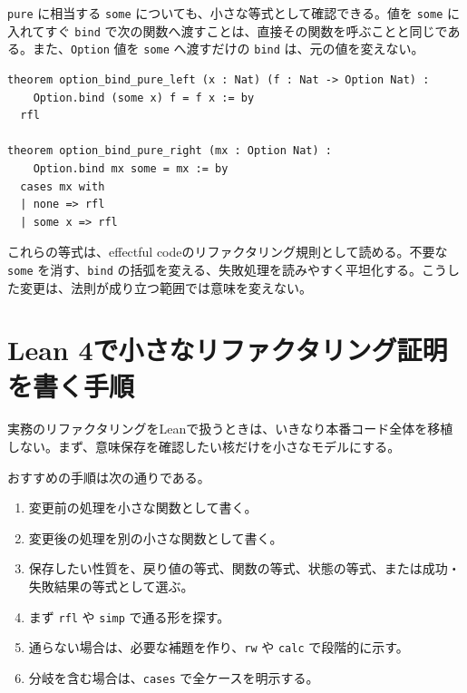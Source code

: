 \texttt{pure} に相当する \texttt{some} についても、小さな等式として確認できる。値を \texttt{some} に入れてすぐ \texttt{bind} で次の関数へ渡すことは、直接その関数を呼ぶことと同じである。また、\texttt{Option} 値を \texttt{some} へ渡すだけの \texttt{bind} は、元の値を変えない。

\begin{listing}[htbp]
\begin{verbatim}
theorem option_bind_pure_left (x : Nat) (f : Nat -> Option Nat) :
    Option.bind (some x) f = f x := by
  rfl

theorem option_bind_pure_right (mx : Option Nat) :
    Option.bind mx some = mx := by
  cases mx with
  | none => rfl
  | some x => rfl
\end{verbatim}
\caption{\texttt{Option} における \texttt{pure} 相当の整理規則}
\label{lst:ch28-option-pure-laws}
\end{listing}

これらの等式は、effectful codeのリファクタリング規則として読める。不要な \texttt{some} を消す、\texttt{bind} の括弧を変える、失敗処理を読みやすく平坦化する。こうした変更は、法則が成り立つ範囲では意味を変えない。

\section{Lean 4で小さなリファクタリング証明を書く手順}

実務のリファクタリングをLeanで扱うときは、いきなり本番コード全体を移植しない。まず、意味保存を確認したい核だけを小さなモデルにする。

\begin{softwarebox}
おすすめの手順は次の通りである。
\begin{enumerate}
\item 変更前の処理を小さな関数として書く。
\item 変更後の処理を別の小さな関数として書く。
\item 保存したい性質を、戻り値の等式、関数の等式、状態の等式、または成功・失敗結果の等式として選ぶ。
\item まず \texttt{rfl} や \texttt{simp} で通る形を探す。
\item 通らない場合は、必要な補題を作り、\texttt{rw} や \texttt{calc} で段階的に示す。
\item 分岐を含む場合は、\texttt{cases} で全ケースを明示する。
\end{enumerate}
\end{softwarebox}


